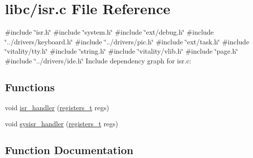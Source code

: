 \hypertarget{a00092}{}\section{libc/isr.c File Reference}
\label{a00092}
{\ttfamily \#include \char`\"{}isr.\+h\char`\"{}}\newline
{\ttfamily \#include \char`\"{}system.\+h\char`\"{}}\newline
{\ttfamily \#include \char`\"{}ext/debug.\+h\char`\"{}}\newline
{\ttfamily \#include \char`\"{}../drivers/keyboard.\+h\char`\"{}}\newline
{\ttfamily \#include \char`\"{}../drivers/pic.\+h\char`\"{}}\newline
{\ttfamily \#include \char`\"{}ext/task.\+h\char`\"{}}\newline
{\ttfamily \#include \char`\"{}vitality/tty.\+h\char`\"{}}\newline
{\ttfamily \#include \char`\"{}string.\+h\char`\"{}}\newline
{\ttfamily \#include \char`\"{}vitality/vlib.\+h\char`\"{}}\newline
{\ttfamily \#include \char`\"{}page.\+h\char`\"{}}\newline
{\ttfamily \#include \char`\"{}../drivers/ide.\+h\char`\"{}}\newline
Include dependency graph for isr.\+c\+:
\subsection*{Functions}
\begin{DoxyCompactItemize}
\item 
void \hyperlink{a00092_a700e3ca056bf69296370f504f2cb6cc8_a700e3ca056bf69296370f504f2cb6cc8}{isr\+\_\+handler} (\hyperlink{a00095_adf58dbaf6139b4957c348711f2026957_adf58dbaf6139b4957c348711f2026957}{registers\+\_\+t} regs)
\item 
void \hyperlink{a00092_abd1fa375737cd5ecd84c082738e3b195_abd1fa375737cd5ecd84c082738e3b195}{sysisr\+\_\+handler} (\hyperlink{a00095_adf58dbaf6139b4957c348711f2026957_adf58dbaf6139b4957c348711f2026957}{registers\+\_\+t} regs)
\end{DoxyCompactItemize}


\subsection{Function Documentation}
\mbox{\label{a00092_a700e3ca056bf69296370f504f2cb6cc8_a700e3ca056bf69296370f504f2cb6cc8}} 
